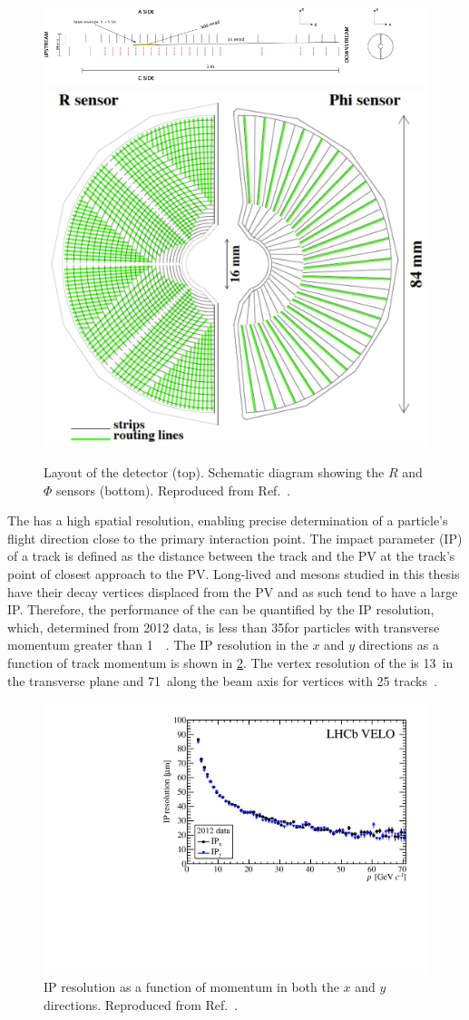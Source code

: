 \begin{figure}
\centering
\includegraphics[width=\linewidth]{figures/detector/VELO_detector_layout_crop.pdf}
\hfill
\includegraphics[width=0.3\linewidth]{figures/detector/randphisensors.pdf}
\caption{Layout of the \velo detector (top). Schematic diagram showing the $R$ and $\Phi$ sensors (bottom). Reproduced from Ref.~\cite{LHCb-DP-2014-002}.}
\label{velolayout}
\end{figure}

The \velo has a high spatial resolution, enabling precise determination of a particle's flight direction close to the primary interaction point. The impact parameter (IP) of a track is defined as the distance between the track and the PV at the track's point of closest approach to the PV. Long-lived \B and \D mesons studied in this thesis have their decay vertices displaced from the PV and as such tend to have a large IP. Therefore, the performance of the \velo can be quantified by the IP resolution, which, determined from 2012 data, is less than 35\mum for particles with transverse momentum greater than 1~\gevc~\cite{LHCb-DP-2014-001}. The IP resolution in the $x$ and $y$ directions as a function of track momentum is shown in \fig\ref{veloperformance}. The vertex resolution of the \velo is 13~\mum in the transverse plane and 71~\mum along the beam axis for vertices with 25 tracks~\cite{LHCb-DP-2014-001}.

\begin{figure}
\centering
\includegraphics[width=0.5\linewidth]{figures/detector/IPRes-Vs-P-CompareIPxIPy-2012.pdf}
\caption{IP resolution as a function of momentum in both the $x$ and $y$ directions. Reproduced from Ref.~\cite{LHCb-DP-2014-001}.}
\label{veloperformance}
\end{figure}

